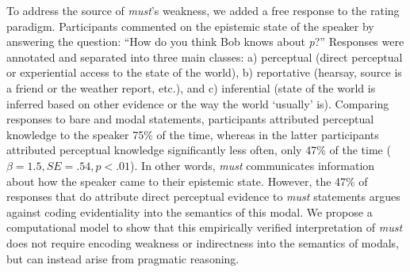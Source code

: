 \documentclass[12pt]{article}
\begin{document}
To address the source of \emph{must}'s weakness, we added a free response to the rating paradigm. Participants commented on the epistemic state of the speaker by answering the question: ``How do you think Bob knows about \emph{p}?'' Responses were annotated and separated into three main classes: a) perceptual (direct perceptual or experiential access to the state of the world), b) reportative (hearsay, source is a friend or the weather report, etc.), and c) inferential (state of the world is inferred based on other evidence or the way the world `usually' is). Comparing responses to bare and modal statements, participants attributed perceptual knowledge to the speaker 75\% of the time, whereas in the latter participants attributed perceptual knowledge significantly less often, only 47\% of the time ($\beta=1.5, SE=.54, p<.01$). In other words, \emph{must} communicates information about how the speaker came to their epistemic state. However, the 47\% of responses that do attribute direct perceptual evidence to \emph{must} statements argues against coding evidentiality into the semantics of this modal. We propose a computational model to show that this empirically verified interpretation of \emph{must} does not require encoding weakness or indirectness into the semantics of modals, but can instead arise from pragmatic reasoning. 
\end{document}
